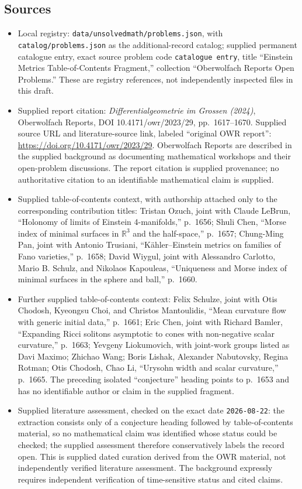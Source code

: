 \documentclass[11pt]{article}
\newcommand{\R}{\mathbb{R}}
\begin{document}
\subsection{Sources}
\begin{itemize}
\item Local registry: \texttt{data/unsolvedmath/problems.json}, with \texttt{catalog/problems.json} as the additional-record catalog; supplied permanent catalogue entry, exact source problem code \texttt{catalogue entry}, title ``Einstein Metrics Table-of-Contents Fragment,'' collection ``Oberwolfach Reports Open Problems.'' These are registry references, not independently inspected files in this draft.
\item Supplied report citation: \emph{Differentialgeometrie im Grossen (2024)}, Oberwolfach Reports, DOI 10.4171/owr/2023/29, pp.\ 1617--1670. Supplied source URL and literature-source link, labeled ``original OWR report'': \url{https://doi.org/10.4171/owr/2023/29}. Oberwolfach Reports are described in the supplied background as documenting mathematical workshops and their open-problem discussions. The report citation is supplied provenance; no authoritative citation to an identifiable mathematical claim is supplied.
\item Supplied table-of-contents context, with authorship attached only to the corresponding contribution titles: Tristan Ozuch, joint with Claude LeBrun, ``Holonomy of limits of Einstein 4-manifolds,'' p.\ 1656; Shuli Chen, ``Morse index of minimal surfaces in \(\R^3\) and the half-space,'' p.\ 1657; Chung-Ming Pan, joint with Antonio Trusiani, ``Kähler--Einstein metrics on families of Fano varieties,'' p.\ 1658; David Wiygul, joint with Alessandro Carlotto, Mario B. Schulz, and Nikolaos Kapouleas, ``Uniqueness and Morse index of minimal surfaces in the sphere and ball,'' p.\ 1660.
\item Further supplied table-of-contents context: Felix Schulze, joint with Otis Chodosh, Kyeongsu Choi, and Christos Mantoulidis, ``Mean curvature flow with generic initial data,'' p.\ 1661; Eric Chen, joint with Richard Bamler, ``Expanding Ricci solitons asymptotic to cones with non-negative scalar curvature,'' p.\ 1663; Yevgeny Liokumovich, with joint-work groups listed as Davi Maximo; Zhichao Wang; Boris Lishak, Alexander Nabutovsky, Regina Rotman; Otis Chodosh, Chao Li, ``Urysohn width and scalar curvature,'' p.\ 1665. The preceding isolated ``conjecture'' heading points to p.\ 1653 and has no identifiable author or claim in the supplied fragment.
\item Supplied literature assessment, checked on the exact date \texttt{2026-08-22}: the extraction consists only of a conjecture heading followed by table-of-contents material, so no mathematical claim was identified whose status could be checked; the supplied assessment therefore conservatively labels the record open. This is supplied dated curation derived from the OWR material, not independently verified literature assessment. The background expressly requires independent verification of time-sensitive status and cited claims.

\end{itemize}
\end{document}
